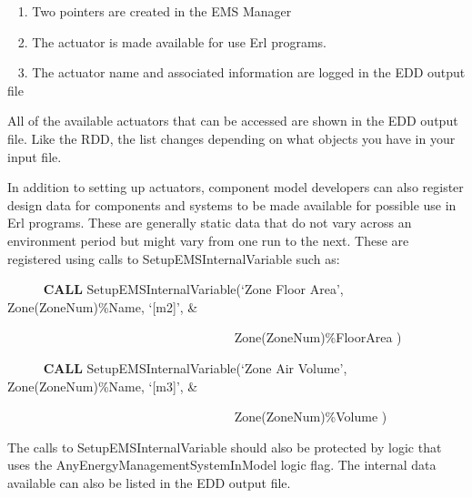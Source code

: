 ~ 1. Two pointers are created in the EMS Manager

~ 2. The actuator is made available for use Erl programs.

~ 3. The actuator name and associated information are logged in the EDD output file

All of the available actuators that can be accessed are shown in the EDD output file. Like the RDD, the list changes depending on what objects you have in your input file.

In addition to setting up actuators, component model developers can also register design data for components and systems to be made available for possible use in Erl programs. These are generally static data that do not vary across an environment period but might vary from one run to the next. These are registered using calls to SetupEMSInternalVariable such as:

~~~~~ \textbf{CALL} SetupEMSInternalVariable(`Zone Floor Area', Zone(ZoneNum)\%Name, `{[}m2{]}', \&

~~~~~~~~~~~~~~~~~~~~~~~~~~~~~~~~~~~ Zone(ZoneNum)\%FloorArea )

~~~~~ \textbf{CALL} SetupEMSInternalVariable(`Zone Air Volume', Zone(ZoneNum)\%Name, `{[}m3{]}', \&

~~~~~~~~~~~~~~~~~~~~~~~~~~~~~~~~~~~ Zone(ZoneNum)\%Volume )

The calls to SetupEMSInternalVariable should also be protected by logic that uses the AnyEnergyManagementSystemInModel logic flag. The internal data available can also be listed in the EDD output file.
